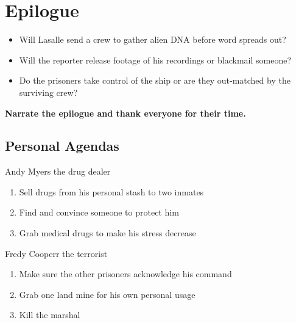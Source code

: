 \chapter{Epilogue}


\begin{rpg-commentbox}{}


\begin{itemize}
    \item Will Lasalle send a crew to gather alien DNA before word spreads out?
    \item Will the reporter release footage of his recordings or blackmail someone?
    \item Do the prisoners take control of the ship or are they out-matched by the surviving crew?
\end{itemize}    

    \medskip

    \textbf{Narrate the epilogue and thank everyone for their time.}
 \end{rpg-commentbox}

 \newsect

 \section{Personal Agendas}


 
\begin{rpg-commentbox}{Andy Myers the drug dealer}
    \begin{enumerate}[label=Act \arabic*]
        \item Sell drugs from his personal stash to two inmates
        \item Find and convince someone to protect him
        \item Grab medical drugs to make his stress decrease
    \end{enumerate}
\end{rpg-commentbox}

\begin{rpg-commentbox}{Fredy Cooperr the terrorist}
    \begin{enumerate}[label=Act \arabic*]
        \item Make sure the other prisoners acknowledge his command
        \item Grab one land mine for his own personal usage
        \item Kill the marshal
    \end{enumerate}
\end{rpg-commentbox}


